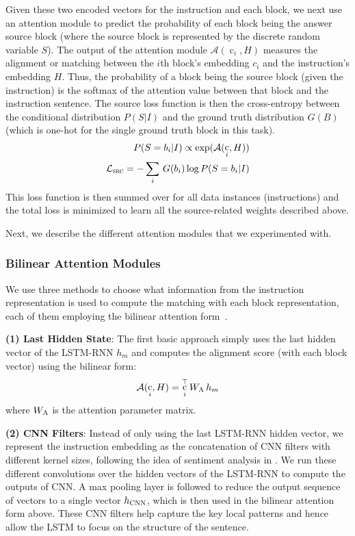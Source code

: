 \documentclass[letterpaper]{article} %
\DeclareMathOperator{\embb}{c}
\begin{document}
Given these two encoded vectors for the instruction and each block, we next use an attention module to predict the probability of each block being the answer source block (where the source block is represented by the discrete random variable $S$).
The output of the attention module $\mathcal{A}(\embb_i, H)$ measures the alignment or matching between the $i$th block's embedding $c_i$ and the instruction's embedding $H$.
Thus, the probability of a block being the source block (given the instruction) is the softmax of the attention value between that block and the instruction sentence.
The source loss function is then the cross-entropy between the conditional distribution $P(S|I)$ and the ground truth distribution $G(B)$ (which is one-hot for the single ground truth block in this task).
\begin{align}
P(S = b_i|I)  \propto \exp(\mathcal{A}(\embb_i, H))\\
\mathcal{L}_\textsc{src}  = -\sum_i\, G(b_i) \log P(S = b_i|I)
\end{align}
This loss function is then summed over for all data instances (instructions) and the total loss is minimized to learn all the source-related weights described above.

Next, we describe the different attention modules that we experimented with.

\subsubsection{Bilinear Attention Modules}
\label{sec:attn}
We use three methods to choose what information from the instruction representation is used to compute the matching with each block representation, each of them employing the bilinear attention form~\cite{luong2015effective}.

\textbf{(1) Last Hidden State}:
The first basic approach simply uses the last hidden vector of the LSTM-RNN $h_m$ and computes the alignment score (with each block vector) using the bilinear form:
\begin{equation}
\mathcal{A}(\embb_i, H) = \embb_i^{\top} W_{\textsc{A}} \, h_m
\end{equation}
where $W_{\textsc{A}}$ is the attention parameter matrix.


\textbf{(2) CNN Filters}:
Instead of only using the last LSTM-RNN hidden vector, we represent the instruction embedding as the concatenation of CNN filters with different kernel sizes, following the idea of sentiment analysis in \cite{kim2014convolutional}.
We run these different convolutions over the hidden vectors of the LSTM-RNN to compute the outputs of CNN. A max pooling layer is followed to reduce the output sequence of vectors to a single vector $h_{\textsc{CNN}}$, which is then used in the bilinear attention form above.
These CNN filters help capture the key local patterns and hence allow the LSTM to focus on the structure of the sentence.
\end{document}
